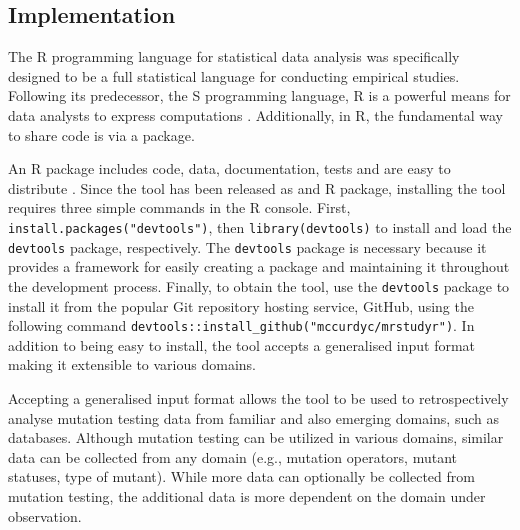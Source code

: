 \subsection{Implementation}

The R programming language for statistical data analysis was specifically designed to
be a full statistical language for conducting empirical studies. Following its predecessor, the S programming
language, R is a powerful means for data analysts to express computations \cite{ihaka1996r}.
Additionally, in R, the fundamental way to share code is via a package.

An R package includes code, data, documentation, tests and are easy to distribute \cite{wickham2015r}.
Since the \mr tool has been released as and R package, installing the tool requires three simple
commands in the R console. First, \texttt{install.packages("devtools")}, then \texttt{library(devtools)}
to install and load the \texttt{devtools}\cite{devtools} package, respectively.
The \texttt{devtools} package is necessary because it provides a framework for easily creating a package
and maintaining it throughout the development process. Finally, to obtain the
\mr\cite{mrstudyr} tool, use the \texttt{devtools} package to install it
from the popular Git repository hosting service, GitHub\cite{github},
using the following command \texttt{devtools::install\_github("mccurdyc/mrstudyr")}. In addition
to being easy to install, the \mr tool accepts a generalised input format making
it extensible to various domains.

Accepting a generalised input format allows the \mr tool to be used to retrospectively analyse mutation testing
data from familiar and also emerging domains, such as databases. Although mutation
testing can be utilized in various domains, similar data can be collected from any
domain (e.g., mutation operators, mutant statuses, type of mutant). While more data
can optionally be collected from mutation testing, the additional data is more
dependent on the domain under observation.
